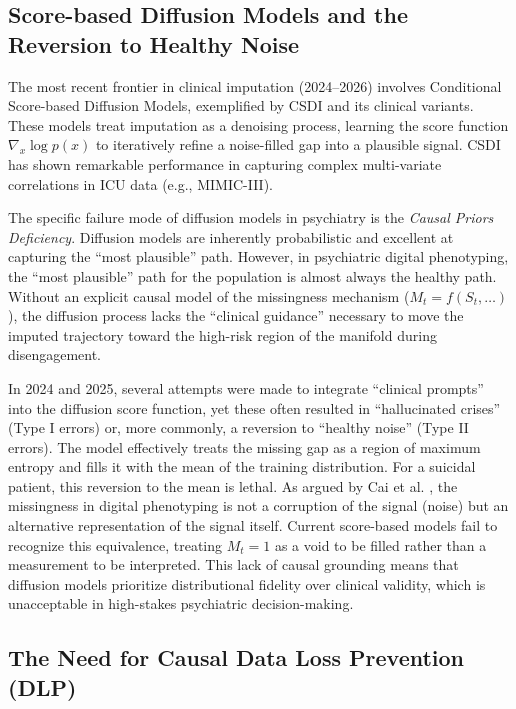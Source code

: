 \subsection{Score-based Diffusion Models and the Reversion to Healthy Noise}

The most recent frontier in clinical imputation (2024--2026) involves Conditional Score-based Diffusion Models, exemplified by CSDI \cite{tashiro2021csdi} and its clinical variants. These models treat imputation as a denoising process, learning the score function $\nabla_x \log p(x)$ to iteratively refine a noise-filled gap into a plausible signal. CSDI has shown remarkable performance in capturing complex multi-variate correlations in ICU data (e.g., MIMIC-III).

The specific failure mode of diffusion models in psychiatry is the \textit{Causal Priors Deficiency}. Diffusion models are inherently probabilistic and excellent at capturing the ``most plausible'' path. However, in psychiatric digital phenotyping, the ``most plausible'' path for the population is almost always the healthy path. Without an explicit causal model of the missingness mechanism ($M_t = f(S_t, \dots)$), the diffusion process lacks the ``clinical guidance'' necessary to move the imputed trajectory toward the high-risk region of the manifold during disengagement.

In 2024 and 2025, several attempts were made to integrate ``clinical prompts'' into the diffusion score function, yet these often resulted in ``hallucinated crises'' (Type I errors) or, more commonly, a reversion to ``healthy noise'' (Type II errors). The model effectively treats the missing gap as a region of maximum entropy and fills it with the mean of the training distribution. For a suicidal patient, this reversion to the mean is lethal. As argued by Cai et al. \cite{cai2026causal_estimands_n_of_1}, the missingness in digital phenotyping is not a corruption of the signal (noise) but an alternative representation of the signal itself. Current score-based models fail to recognize this equivalence, treating $M_t=1$ as a void to be filled rather than a measurement to be interpreted. This lack of causal grounding means that diffusion models prioritize distributional fidelity over clinical validity, which is unacceptable in high-stakes psychiatric decision-making.

\subsection{The Need for Causal Data Loss Prevention (DLP)}

